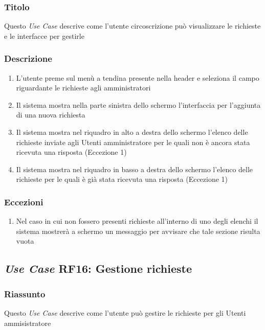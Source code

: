         \subsubsection{Titolo}
            Questo \textit{Use Case} descrive come l'utente circoscrizione può visualizzare le richieste e le interfacce per gestirle
        \subsubsection{Descrizione}
            \begin{enumerate}
                \item L'utente preme sul menù a tendina presente nella header e seleziona il campo riguardante le richieste agli amministratori
                \item Il sistema mostra nella parte sinistra dello schermo l'interfaccia per l'aggiunta di una nuova richiesta
                \item Il sistema mostra nel riquadro in alto a destra dello schermo l'elenco delle richieste inviate agli Utenti amministratore per le quali non è ancora stata ricevuta una risposta (Eccezione 1)
                \item Il sistema mostra nel riquadro in basso a destra dello schermo l'elenco delle richieste per le quali è già stata ricevuta una risposta (Eccezione 1)
            \end{enumerate}
        \subsubsection{Eccezioni}
            \begin{enumerate}
                \item Nel caso in cui non fossero presenti richieste all'interno di uno degli elenchi il sistema mostrerà a schermo un messaggio per avvisare che tale sezione risulta vuota
            \end{enumerate}

    \subsection{\textit{Use Case} RF16: Gestione richieste}
        \subsubsection{Riassunto}
            Questo \textit{Use Case} descrive come l'utente può gestire le richieste per gli Utenti ammisistratore
